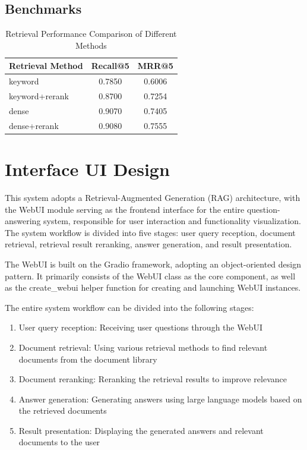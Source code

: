 \documentclass[twoside]{article}
\begin{document}
\subsection{Benchmarks}

\vspace{5pt}
\begin{table}[htbp]
\centering
\setlength{\tabcolsep}{10pt}
\begin{tabular}{p{3cm} c c}
\toprule
\textbf{Retrieval Method} & \textbf{Recall@5} & \textbf{MRR@5} \\
\midrule
keyword & 0.7850 & 0.6006 \\
keyword+rerank & 0.8700 & 0.7254 \\
dense & 0.9070 & 0.7405 \\
dense+rerank & 0.9080 & 0.7555 \\
\bottomrule
\end{tabular}
\caption{Retrieval Performance Comparison of Different Methods}
\label{tab:dataset_metrics}
\end{table}
\vspace{5pt}



\section{Interface UI Design}
This system adopts a Retrieval-Augmented Generation (RAG) architecture, with the WebUI module serving as the frontend interface for the entire question-answering system, responsible for user interaction and functionality visualization. The system workflow is divided into five stages: user query reception, document retrieval, retrieval result reranking, answer generation, and result presentation.

The WebUI is built on the Gradio framework, adopting an object-oriented design pattern. It primarily consists of the WebUI class as the core component, as well as the create\_webui helper function for creating and launching WebUI instances.

The entire system workflow can be divided into the following stages:

\begin{enumerate}
    \item User query reception: Receiving user questions through the WebUI
    \item Document retrieval: Using various retrieval methods to find relevant documents from the document library
    \item Document reranking: Reranking the retrieval results to improve relevance
    \item Answer generation: Generating answers using large language models based on the retrieved documents
    \item Result presentation: Displaying the generated answers and relevant documents to the user
\end{enumerate}
\end{document}
